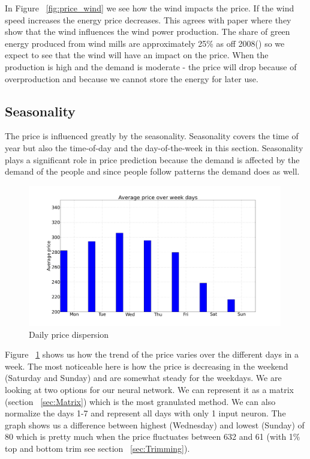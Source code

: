 In Figure ~\ref{fig:price_wind} we see how the wind impacts the price. If the wind speed increases the energy price decreases. This agrees with paper \cite{dayAheadImpactOfWindPowerForecasts} where they show that the wind influences the wind power production. The share of green energy produced from wind mills are approximately 25\% as off 2008(\cite{windPowerDanishLiberalized}) so we expect to see that the wind will have an impact on the price. When the production is high and the demand is moderate - the price will drop because of overproduction and because we cannot store the energy for later use.

\subsection{Seasonality}\label{sec:seasonality}
The price is influenced greatly by the seasonality. Seasonality covers the time of year but also the time-of-day and the day-of-the-week in this section. Seasonality plays a significant role in price prediction because the demand is affected by the demand of the people and since people follow patterns the demand does as well.

\begin{figure}[H]
\centering
\includegraphics[width=0.99\textwidth ]{billeder/energy_price_plots/Average_price_over_weekdays.png}
\caption{Daily price dispersion}
\label{fig:price_over_weekdays}
\end{figure}

Figure ~\ref{fig:price_over_weekdays} shows us how the trend of the price varies over the different days in a week. The most noticeable here is how the price is decreasing in the weekend (Saturday and Sunday) and are somewhat steady for the weekdays. We are looking at two options for our neural network. We can represent it as a matrix (section ~\ref{sec:Matrix}) which is the most granulated method. We can also normalize the days 1-7 and represent all days with only 1 input neuron.
The graph shows us a difference between highest (Wednesday) and lowest (Sunday) of 80 which is pretty much when the price fluctuates between 632 and 61 (with 1\% top and bottom trim see section ~\ref{sec:Trimming}).


